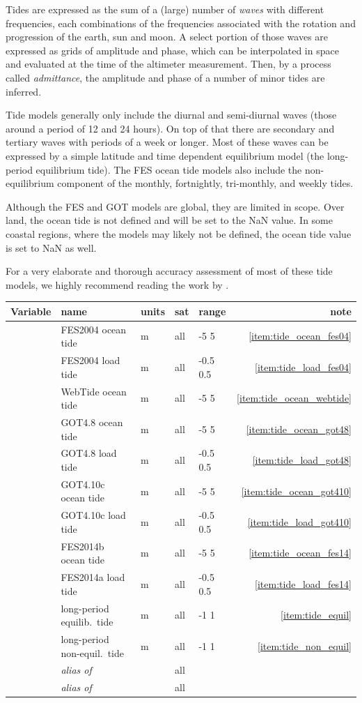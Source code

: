 \documentclass[a4paper,11pt,openany,natbib,nomargin]{thesis}
\newcommand\alias[1]{\emph{alias of} \var{#1}}
\newenvironment{vartable}{
\begin{table}[ht]
\small
\begin{tabular}{lllllr}
\hline\hline
Variable & name & units & sat & range & note \\
\hline\hline
}{
\hline
\end{tabular}
\end{table}
}
\begin{document}
Tides are expressed as the sum of a (large) number of \emph{waves} with different frequencies, each combinations of the frequencies associated with the rotation and progression of the earth, sun and moon. A select portion of those waves are expressed as grids of amplitude and phase, which can be interpolated in space and evaluated at the time of the altimeter measurement. Then, by a process called \emph{admittance}, the amplitude and phase of a number of minor tides are inferred.

Tide models generally only include the diurnal and semi-diurnal waves (those around a period of 12 and 24 hours). On top of that there are secondary and tertiary waves with periods of a week or longer. Most of these waves can be expressed by a simple latitude and time dependent equilibrium model (the long-period equilibrium tide). The FES ocean tide models also include the non-equilibrium component of the monthly, fortnightly, tri-monthly, and weekly tides.

Although the FES and GOT models are global, they are limited in scope. Over land, the ocean tide is not defined and will be set to the NaN value. In some coastal regions, where the models may likely not be defined, the ocean tide value is set to NaN as well.

For a very elaborate and thorough accuracy assessment of most of these tide models, we highly recommend reading the work by \citet{stammer2014}.

\begin{vartable}
\var{tide_ocean_fes04}   & FES2004  ocean tide & m & all & -5 5 & \ref{item:tide_ocean_fes04} \\
\var{tide_load_fes04}    & FES2004  load  tide & m & all & -0.5 0.5 & \ref{item:tide_load_fes04} \\
\var{tide_ocean_webtide} & WebTide  ocean tide & m & all & -5 5 & \ref{item:tide_ocean_webtide} \\
\var{tide_ocean_got48}   & GOT4.8   ocean tide & m & all & -5 5 & \ref{item:tide_ocean_got48} \\
\var{tide_load_got48}    & GOT4.8   load  tide & m & all & -0.5 0.5 & \ref{item:tide_load_got48} \\
\var{tide_ocean_got410}  & GOT4.10c ocean tide & m & all & -5 5 & \ref{item:tide_ocean_got410} \\
\var{tide_load_got410}   & GOT4.10c load  tide & m & all & -0.5 0.5 & \ref{item:tide_load_got410} \\
\var{tide_ocean_fes14}   & FES2014b ocean tide & m & all & -5 5 & \ref{item:tide_ocean_fes14} \\
\var{tide_load_fes14}    & FES2014a load  tide & m & all & -0.5 0.5 & \ref{item:tide_load_fes14} \\
\var{tide_equil}         & long-period equilib.\ tide & m & all & -1 1 & \ref{item:tide_equil} \\
\var{tide_non_equil}     & long-period non-equil.\ tide & m & all & -1 1 & \ref{item:tide_non_equil} \\
\hline
\var{tide_ocean} & \alias{tide_ocean_fes14} && all && \\
\var{tide_load}  & \alias{tide_load_fes14} && all && \\
\end{vartable}
\end{document}
